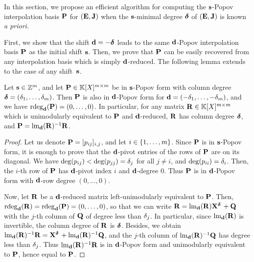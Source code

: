 \documentclass[preprint]{sig-alternate-05-2015}
\begin{document}
In this section, we propose an efficient algorithm for computing the
$\shifts$-Popov interpolation basis $\intBasis$ for $(\evMat,\mulmat)$ when the
$\shifts$-minimal degree $\minDegs$ of $(\evMat,\mulmat)$ is known \emph{a
priori}.

First, we show that the shift $\shifts[d] = -\minDegs$ leads to the same
$\shifts[d]$-Popov interpolation basis $\intBasis$ as the initial shift
$\shifts$. Then, we prove that $\intBasis$ can be easily recovered from any interpolation
basis which is simply $\shifts[d]$-reduced. The following lemma
extends~\cite[Lemmas~15 and~17]{SarSto11} to the case of any shift~$\shifts$.

\begin{lem}
  \label{lem:minDeg_shift}
  Let $\shifts\in\shiftSpace$, and let $\mat{P}\in\polMatSpace[\rdim]$ be in
  $\shifts$-Popov form with column degree $\minDegs =
  (\minDeg_1,\ldots,\minDeg_\rdim)$. Then $\mat{P}$ is also in
  $\shifts[d]$-Popov form for $\shifts[d] =
  (-\minDeg_1,\ldots,-\minDeg_\rdim)$, and we have
  $\rdeg[{\shifts[d]}]{\mat{P}} = (0,\ldots,0)$. In particular, for any matrix
  $\mat{R} \in \polMatSpace[\rdim]$ which is unimodularly equivalent to
  $\mat{P}$ and $\shifts[d]$-reduced, $\mat{R}$ has column degree $\minDegs$,
  and $\mat{P} = \leadingMat[{\shifts[d]}]{\mat{R}}^{-1} \mat{R}$.
\end{lem}
\begin{proof}
  Let us denote $\mat{P} = [p_{ij}]_{i,j}$, and let $i \in \{1,\ldots,\rdim\}$.
  Since $\mat{P}$ is in $\shifts$-Popov form, it is enough to prove that the
  $\shifts[d]$-pivot entries of the rows of $\mat{P}$ are on its diagonal. We
  have $\deg(p_{ij}) < \deg(p_{jj}) = \minDeg_j$ for all $j\neq i$, and
  $\deg(p_{ii}) = \minDeg_i$. Then, the $i$-th row of $\mat{P}$ has
  $\shifts[d]$-pivot index $i$ and $\shifts[d]$-degree $0$. Thus $\mat{P}$ is
  in $\shifts[d]$-Popov form with $\shifts[d]$-row degree $(0,\ldots,0)$.

  Now, let $\mat{R}$ be a $\shifts[d]$-reduced matrix left-unimodularly
  equivalent to $\mat{P}$. Then, $\rdeg[{\shifts[d]}]{\mat{R}} =
  \rdeg[{\shifts[d]}]{\mat{P}} = (0,\ldots,0)$, so that we can write $\mat{R} =
  \leadingMat[{\shifts[d]}]{\mat{R}} \shiftMat{\minDegs} + \mat{Q}$ with the
  $j$-th column of $\mat{Q}$ of degree less than $\minDeg_j$. In particular,
  since $\leadingMat[{\shifts[d]}]{\mat{R}}$ is invertible, the column degree
  of $\mat{R}$ is $\minDegs$. Besides, we obtain
  $\leadingMat[{\shifts[d]}]{\mat{R}}^{-1} \mat{R} = \shiftMat{\minDegs} +
  \leadingMat[{\shifts[d]}]{\mat{R}}^{-1} \mat{Q}$, and the $j$-th column of
  $\leadingMat[{\shifts[d]}]{\mat{R}}^{-1} \mat{Q}$ has degree less than
  $\minDeg_j$. Thus $\leadingMat[{\shifts[d]}]{\mat{R}}^{-1} \mat{R}$ is in
  $\shifts[d]$-Popov form and unimodularly equivalent to $\mat{P}$, hence equal
  to $\mat{P}$.
\end{proof}
\end{document}
